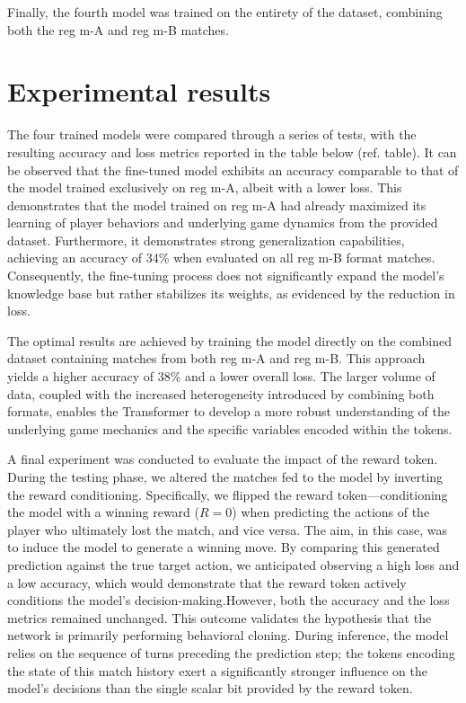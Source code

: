 \documentclass{article}
\begin{document}
Finally, the fourth model was trained on the entirety of the dataset, combining both the reg m-A and reg m-B matches.


\section{Experimental results}
\label{sec:experiments}
The four trained models were compared through a series of tests, with the resulting accuracy and loss metrics reported in the table below (ref. table). It can be observed that the fine-tuned model exhibits an accuracy comparable to that of the model trained exclusively on reg m-A, albeit with a lower loss. This demonstrates that the model trained on reg m-A had already maximized its learning of player behaviors and underlying game dynamics from the provided dataset. Furthermore, it demonstrates strong generalization capabilities, achieving an accuracy of 34\% when evaluated on all reg m-B format matches. Consequently, the fine-tuning process does not significantly expand the model's knowledge base but rather stabilizes its weights, as evidenced by the reduction in loss. 

The optimal results are achieved by training the model directly on the combined dataset containing matches from both reg m-A and reg m-B. This approach yields a higher accuracy of 38\% and a lower overall loss. The larger volume of data, coupled with the increased heterogeneity introduced by combining both formats, enables the Transformer to develop a more robust understanding of the underlying game mechanics and the specific variables encoded within the tokens.

A final experiment was conducted to evaluate the impact of the reward token. During the testing phase, we altered the matches fed to the model by inverting the reward conditioning. Specifically, we flipped the reward token—conditioning the model with a winning reward ($R=0$) when predicting the actions of the player who ultimately lost the match, and vice versa. The aim, in this case, was to induce the model to generate a winning move. By comparing this generated prediction against the true target action, we anticipated observing a high loss and a low accuracy, which would demonstrate that the reward token actively conditions the model's decision-making.However, both the accuracy and the loss metrics remained unchanged. This outcome validates the hypothesis that the network is primarily performing behavioral cloning. During inference, the model relies on the sequence of turns preceding the prediction step; the tokens encoding the state of this match history exert a significantly stronger influence on the model's decisions than the single scalar bit provided by the reward token. 
\end{document}
